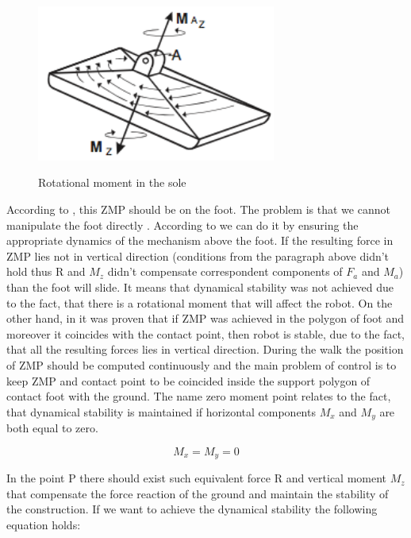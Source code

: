 \documentclass[12pt,a4paper]{report}
\begin{document}
		\begin{figure}[h!]
			\vspace{-0.2cm}
			\centering
			{\includegraphics[width=0.7\textwidth]{2}}
			\caption{Rotational moment in the sole}
			\label{fig:2}
			\vspace{-0.1cm}
		\end{figure}

		According to \cite{kajita2003biped}, this ZMP should be on the foot. The problem is that we cannot manipulate the foot directly \cite{mitobe2000control}. According to \cite{vukobratovic2004zero} we can do it by ensuring the appropriate dynamics of the mechanism above the foot. If the resulting force in ZMP lies not in vertical direction (conditions from the paragraph above didn't hold thus R and $M_z$ didn't compensate correspondent components of $F_a$ and $M_a$) than the foot will slide. It means that dynamical stability was not achieved due to the fact, that there is a rotational moment that will affect the robot. On the other hand, in \cite{sardain2004forces} it was proven that if ZMP was achieved in the polygon of foot and moreover it coincides with the contact point, then robot is stable, due to the fact, that all the resulting forces lies in vertical direction. During the walk the position of ZMP should be computed continuously and the main problem of control is to keep ZMP and contact point to be coincided inside the support polygon of contact foot with the ground.
		The name zero moment point relates to the fact, that dynamical stability is maintained if horizontal components $M_x$ and $M_y$ are both equal to zero.
	
		\begin{equation}\label{eq:ZMP1}
			M_x = M_y = 0
		\end{equation}

		In the point P there should exist such equivalent force R and vertical moment $M_z$ that compensate the force reaction of the ground and maintain the stability of the construction. If we want to achieve the dynamical stability the following equation holds:
\end{document}
